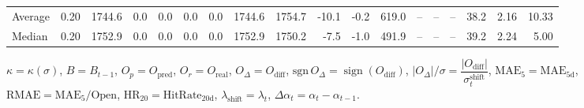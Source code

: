 \begin{threeparttable}
{\begin{tabular}{lrrrrrrrrrrrrrrrrr}
Average &     0.20 & 1744.6 &               0.0 &               0.0 &                0.0 &                0.0 & 1744.6 & 1754.7 &      -10.1 &                     -0.2 &               619.0 &         -- &        -- &             -- &             38.2 &            2.16 &                  10.33 \\
 Median &     0.20 & 1752.9 &               0.0 &               0.0 &                0.0 &                0.0 & 1752.9 & 1750.2 &       -7.5 &                     -1.0 &               491.9 &         -- &        -- &             -- &             39.2 &            2.24 &                   5.00 \\
\bottomrule
\end{tabular}
}
\begin{tablenotes}\footnotesize
\item $\kappa=\kappa(\sigma)$, $B=B_{t-1}$, $O_p=O_{\text{pred}}$, $O_r=O_{\text{real}}$, $O_\Delta=O_{\text{diff}}$, $\mathrm{sgn}\,O_\Delta=\operatorname{sign}(O_{\text{diff}})$, $|O_\Delta|/\sigma=\dfrac{|O_{\text{diff}}|}{\sigma_t^{\text{shift}}}$, $\mathrm{MAE}_5=\mathrm{MAE}_{5\text{d}}$, $\mathrm{RMAE}= \mathrm{MAE}_5 / \text{Open}$, $\mathrm{HR}_{20}=\mathrm{HitRate}_{20\text{d}}$, 
$\lambda_{\text{shift}}=\lambda_t$, 
$\Delta\alpha_t=\alpha_t-\alpha_{t-1}$.
\end{tablenotes}
\end{threeparttable}
\endgroup


